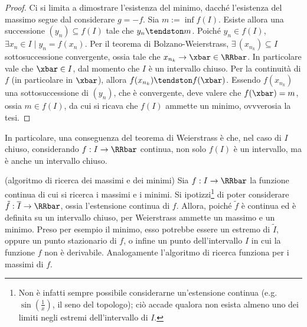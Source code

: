 \documentclass[11pt]{article}
\begin{document}
	\begin{proof}
		Ci si limita a dimostrare l'esistenza del minimo, dacché l'esistenza
		del massimo segue dal considerare $g = -f$. Sia $m := \inf f(I)$. Esiste
		allora una successione $(y_n) \subseteq f(I)$ tale che
		$y_n \tendston m$. Poiché $y_n \in f(I)$, $\exists x_n \in I \mid
		y_n = f(x_n)$. Per il teorema di Bolzano-Weierstrass, $\exists \, (x_{n_k})
		\subseteq I$ sottosuccessione convergente, ossia tale che
		$x_{n_k} \to \xbar \in \RRbar$. In particolare vale che
		$\xbar \in I$, dal momento che $I$ è un intervallo chiuso. %
		Per la continuità di $f$ (in particolare in $\xbar$), allora $f(x_{n_k}) \tendston f(\xbar)$.
		Essendo $f(x_{n_k})$ una sottosuccessione di $(y_n)$, che è
		convergente, deve valere che $f(\xbar) = m$, ossia
		$m \in f(I)$, da cui si ricava che $f(I)$ ammette un minimo,
		ovvverosia la tesi.
	\end{proof}

	\begin{remark}
		In particolare, una conseguenza del teorema di Weierstrass è che, nel caso di $I$ chiuso,
		considerando $f : I \to \RRbar$ continua, non solo $f(I)$ è un intervallo, ma è anche un
		intervallo chiuso.
	\end{remark}
	
	\begin{remark} (algoritmo di ricerca dei massimi e dei minimi) Sia $f : I \to \RRbar$ la funzione continua di cui si
		ricerca i massimi e i minimi. Si ipotizzi\footnote{Non è infatti sempre possibile considerarne un'estensione continua (e.g.~$\sin\left(\frac1{x}\right)$, il seno del topologo); ciò accade qualora non esista almeno uno dei limiti negli estremi dell'intervallo di $I$.} di poter considerare $\tilde{f} : \overline{I} \to \RRbar$, ossia l'estensione
		continua di $f$. Allora, poiché $\tilde{f}$ è continua ed è definita su
		un intervallo chiuso, per Weierstrass ammette un massimo e un
		minimo. Preso per esempio il minimo, esso potrebbe essere un
		estremo di $\tilde{I}$, oppure un punto stazionario di $f$, o infine un punto dell'intervallo $I$ in cui
		la funzione $f$ non è derivabile. Analogamente l'algoritmo di ricerca funziona per i massimi di $f$.
	\end{remark}
	
\end{document}
